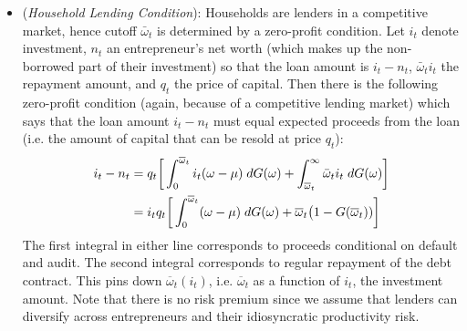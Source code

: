 \documentclass[12pt]{article}
\theoremstyle{plain}
\theoremstyle{definition}
\theoremstyle{remark}
\begin{document}
\begin{itemize}
  \item
    (\emph{Household Lending Condition}):
    Households are lenders in a competitive market, hence cutoff
    $\bar{\omega}_t$ is determined by a zero-profit condition.
    Let $i_t$ denote investment, $n_t$ an entrepreneur's net worth
    (which makes up the non-borrowed part of their investment) so that
    the loan amount is $i_t-n_t$, $\bar{\omega}_ti_t$ the repayment
    amount, and $q_t$ the price of capital.
    Then there is the following zero-profit condition (again, because of
    a competitive lending market) which says that the loan amount
    $i_t-n_t$ must equal expected proceeds from the loan (i.e. the
    amount of capital that can be resold at price $q_t$):
    \begin{align}
      i_t-n_t
      &=
      q_t
      \bigg[
      \int_0^{\overline{\omega}_t}
      i_t(\omega-\mu)\;dG(\omega)
      +
      \int_{\overline{\omega}_t}^\infty
      \bar{\omega}_ti_t\;dG(\omega)
      \bigg]
      \notag
      \\
      &=
      i_tq_t
      \bigg[
      \int_0^{\overline{\omega}_t}
      (\omega-\mu)\;dG(\omega)
      +
      \overline{\omega}_t\big(1-G(\overline{\omega}_t))
      \bigg]
      \label{cf:be}
    \end{align}
    The first integral in either line corresponds to proceeds
    conditional on default and audit.  The second integral corresponds
    to regular repayment of the debt contract.  This pins down
    $\overline{\omega}_t(i_t)$, i.e.  $\overline{\omega}_t$ as a
    function of $i_t$, the investment amount.
    Note that there is no risk premium since we assume that lenders can
    diversify across entrepreneurs and their idiosyncratic productivity
    risk.


\end{itemize}
\end{document}
